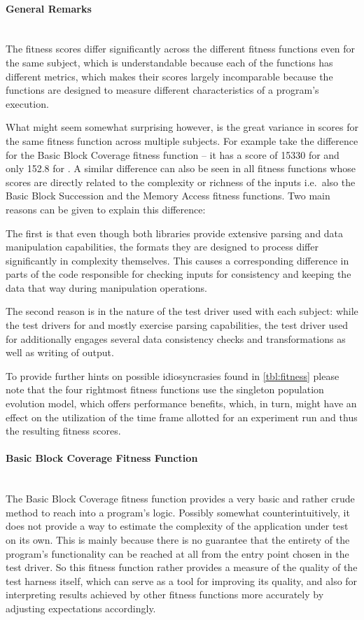 \paragraph{General Remarks} ~\\
The fitness scores differ significantly across the different fitness functions even for the same subject,
which is understandable because each of the functions has different metrics, which makes their scores
largely incomparable because the functions are designed to measure different characteristics of a
program's execution.

What might seem somewhat surprising however, is the great variance in scores for the same fitness function
across multiple subjects. For example take the difference for the Basic Block Coverage fitness function -- it
has a score of 15330 for \libpng and only 152.8 for \libpcap. 
A similar difference can also be seen in all fitness functions whose scores are directly related to the
complexity or richness of the inputs i.e.\ also the Basic Block Succession and the Memory Access fitness
functions. Two main reasons can be given to explain this difference:

The first is that even though both libraries provide extensive parsing and data manipulation capabilities,
the formats they are designed to process differ significantly in complexity themselves. This causes a
corresponding difference in parts of the code responsible for checking inputs for consistency and keeping
the data that way during manipulation operations.

The second reason is in the nature of the test driver used with each subject: while the test drivers for
\libpcap and \libxml mostly exercise parsing capabilities, the test driver used for \libpng additionally
engages several data consistency checks and transformations as well as writing of output.

To provide further hints on possible idiosyncrasies found in \cref{tbl:fitness} please note that the four
rightmost fitness functions use the singleton population evolution model, which offers performance benefits,
which, in turn, might have an effect on the utilization of the time frame allotted for an experiment run and
thus the resulting fitness scores.

\paragraph{Basic Block Coverage Fitness Function} ~\\
The Basic Block Coverage fitness function provides a very basic and rather crude method to reach into a
program's logic. Possibly somewhat counterintuitively, it does not provide a way to estimate the complexity of
the application under test on its own. This is mainly because there is no guarantee that the entirety of
the program's functionality can be reached at all from the entry point chosen in the test driver. So this
fitness function rather provides a measure of the quality of the test harness itself, which can serve as a
tool for improving its quality, and also for interpreting results achieved by other fitness functions more
accurately by adjusting expectations accordingly.

